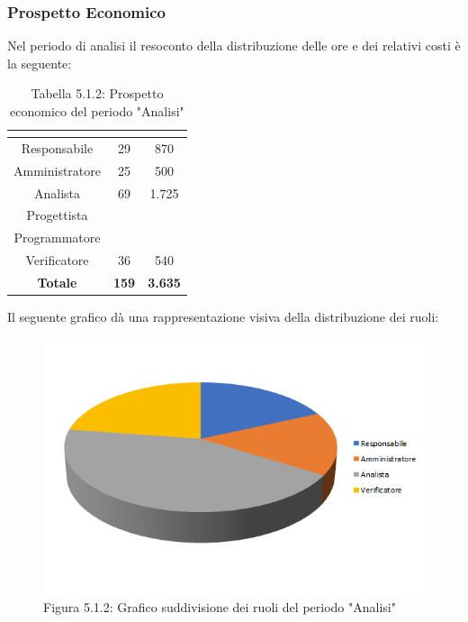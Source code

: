 \subsubsection{Prospetto Economico}
Nel periodo di analisi il resoconto della distribuzione delle ore e dei relativi costi è la seguente:

\renewcommand{\arraystretch}{1.5}
\begin{table}[H]
\begin{center}
\begin{tabular}{|c|c|c|}
\hline
\rowcolor{title_row}
\textbf{\color{title_text}{Ruolo}}  & \textbf{\color{title_text}{Ore}} & \textbf{\color{title_text}{Costo in \euro}} \\ \hline
Responsabile    & 29           & 870                 \\ \hline
Amministratore  & 25           & 500                 \\ \hline
Analista        & 69           & 1.725                \\ \hline
Progettista     &              &                     \\ \hline
Programmatore   &              &                     \\ \hline
Verificatore    & 36           & 540                 \\ \hline
\textbf{Totale} & \textbf{159}    & \textbf{3.635}    \\ \hline
\end{tabular}
\caption{Tabella 5.1.2: Prospetto economico del periodo "Analisi"\label{}}
\end{center}
\end{table}
\renewcommand{\arraystretch}{1}

Il seguente grafico dà una rappresentazione visiva della distribuzione dei ruoli: \\
\begin{figure} [H]
	\centering
	\includegraphics[scale=1]{Res/ExcelGrafici/Grafici/AnalisiRuoli.png}
	\caption{Figura 5.1.2: Grafico suddivisione dei ruoli del periodo "Analisi"}\label{}
\end{figure}

\pagebreak
